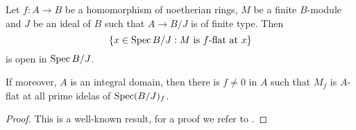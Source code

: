 \begin{lemma}\label{lma-flatlocusopenalge}
    Let $f:A\rightarrow B$ be a homomorphism of noetherian rings, $M$ be a finite $B$-module and $J$ be an ideal of $B$ such that $A\rightarrow B/J$ is of finite type. Then
    \[  
        \left\{ x\in \operatorname{Spec} B/J: M\text{ is }f\text{-flat at }x \right\}
    \]
    is open in $\operatorname{Spec} B/J$.

    If moreover, $A$ is an integral domain, then there is $f\neq 0$ in $A$ such that $M_f$ is $A$-flat at all prime idelas of $\operatorname{Spec} (B/J)_f$.
\end{lemma}
\begin{proof}
    This is a well-known result, for a proof we refer to \cite[Satz~1]{Kie67}.
\end{proof}

\printbibliography
